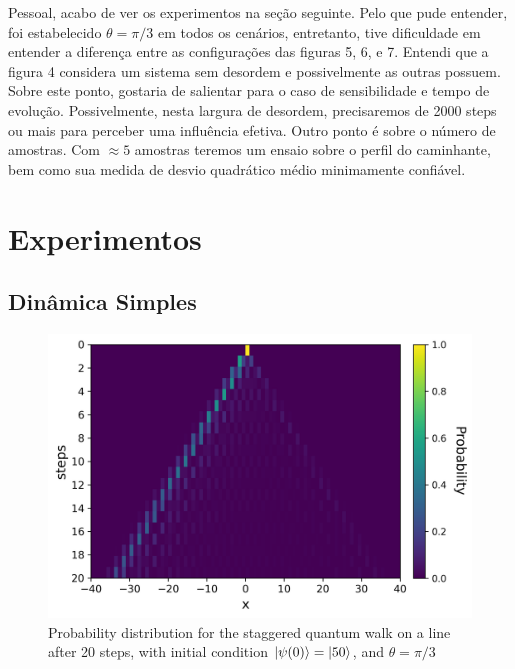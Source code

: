 \documentclass[11pt]{article}
\theoremstyle{plain}
\begin{document}
Pessoal, acabo de ver os experimentos na seção seguinte. Pelo que pude entender, foi estabelecido $\theta=\pi/3$ em todos os cenários, entretanto, tive dificuldade em entender a diferença entre as configurações das figuras 5, 6, e 7. Entendi que a figura 4 considera um sistema sem desordem e possivelmente as outras possuem. Sobre este ponto, gostaria de salientar para o caso de sensibilidade e tempo de evolução. Possivelmente, nesta largura de desordem, precisaremos de 2000 steps ou mais para perceber uma influência efetiva. Outro ponto é sobre o número de amostras. Com $\approx 5$ amostras teremos um ensaio sobre o perfil do caminhante, bem como sua medida de desvio quadrático médio minimamente confiável. 


\clearpage

\section{Experimentos}
\subsection{Dinâmica Simples}
\begin{figure}[!h]
	\centering
	\includegraphics[scale=0.70]{img/Experiments/sqw_N121_t20_thetapi3-pi3_init0.png}
	\caption{Probability distribution for the staggered quantum walk on a line after 20 steps, with initial condition $\ket{\psi(0)}=\ket{50}$, and $\theta = \pi/3$} 
	\label{fig:stagQWSimulMultTheta}
\end{figure}\par
\end{document}
